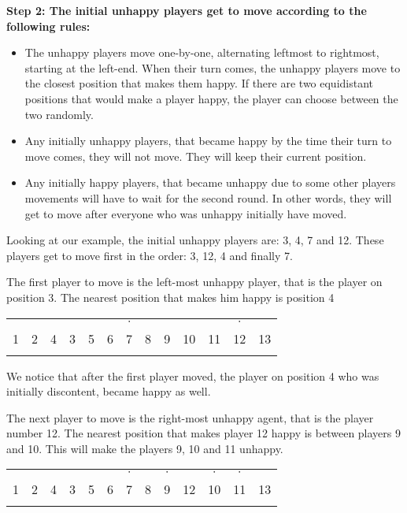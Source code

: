 \documentclass[../main.tex]{subfiles}
\begin{document}
\textbf{Step 2:  The initial unhappy players get to move according to the following rules: }
\begin{itemize}
    \item  The unhappy players move one-by-one, alternating leftmost to rightmost, starting at the left-end. When their turn comes, the unhappy players move to the closest position that makes them happy. If there are two equidistant positions that would make a player happy, the player can choose between the two randomly.
    \item Any initially unhappy players, that became happy by the time their turn to move comes, they will not move. They will keep their current position.
    \item Any initially happy players, that became unhappy due to some other players movements will have to wait for the second round. In other words, they will get to move after everyone who was unhappy initially have moved.
\end{itemize}


Looking at our example, the initial unhappy players are: 3, 4, 7 and 12. These players get to move first in the order: 3, 12, 4 and finally 7. 

The first player to move is the left-most unhappy player, that is the player on position 3. The nearest position that makes him happy is position 4

\begin{table}[H]
\begin{center}
{\begin{tabular}{| c |c| c| c| c |c| c |c| c |c|c|c|c|}
\hline
 & &  & & & & $\cdot$ & &  & & & $\cdot$ &  \\
  1 & 2 &4 &3 &5 &6  &7 &8 &9 & 10 & 11 & 12 & 13 \\
\x &\x &\x &\z &\z &\z  &\x &\z &\x & \z&\x &\z & \x\\
 \hline
\end{tabular}}
\end{center}
\end{table}

We notice that after the first player moved, the player on position 4 who was initially discontent, became happy as well. 

The next player to move is the right-most unhappy agent, that is the player number 12. The nearest position that makes player 12 happy is between players 9 and 10. This will make the players 9, 10 and 11 unhappy.
 
\begin{table}[H]
\begin{center}
{\begin{tabular}{| c |c| c| c| c |c| c |c| c |c|c|c|c|}
\hline
 & &  & & & & $\cdot$ & & $\cdot$  & &$\cdot$  & $\cdot$ &  \\
  1 & 2 &4 &3 &5 &6  &7 &8 &9 & 12 & 10 & 11 & 13 \\
\x &\x &\x &\z &\z &\z  &\x &\z &\x & \z&\z &\x & \x\\
 \hline
\end{tabular}}
\end{center}
\end{table}
\end{document}
